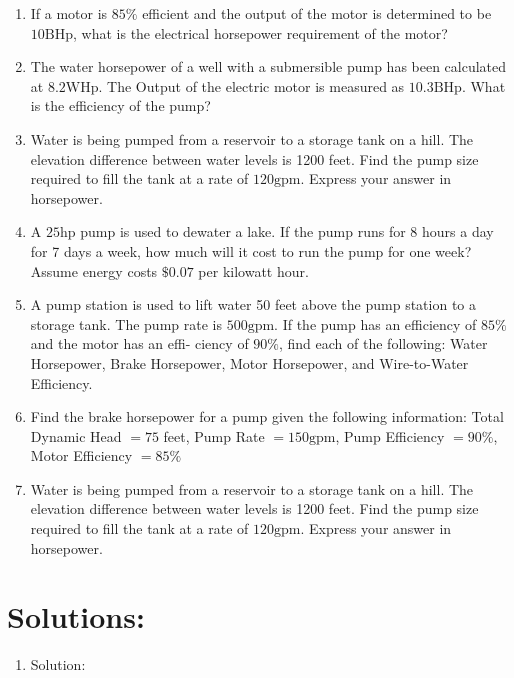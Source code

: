 \documentclass[10pt]{article}
\begin{document}
\begin{enumerate}
\begin{enumerate}
\begin{enumerate}
  \item If a motor is $85 \%$ efficient and the output of the motor is determined to be $10 \mathrm{BHp}$, what is the electrical horsepower requirement of the motor?

  \item The water horsepower of a well with a submersible pump has been calculated at $8.2 \mathrm{WHp}$. The Output of the electric motor is measured as $10.3 \mathrm{BHp}$. What is the efficiency of the pump?

  \item Water is being pumped from a reservoir to a storage tank on a hill. The elevation difference between water levels is 1200 feet. Find the pump size required to fill the tank at a rate of $120 \mathrm{gpm}$. Express your answer in horsepower.

  \item A $25 \mathrm{hp}$ pump is used to dewater a lake. If the pump runs for 8 hours a day for 7 days a week, how much will it cost to run the pump for one week? Assume energy costs $\$ 0.07$ per kilowatt hour.

  \item A pump station is used to lift water 50 feet above the pump station to a storage tank. The pump rate is $500 \mathrm{gpm}$. If the pump has an efficiency of $85 \%$ and the motor has an effi- ciency of $90 \%$, find each of the following: Water Horsepower, Brake Horsepower, Motor Horsepower, and Wire-to-Water Efficiency.

  \item Find the brake horsepower for a pump given the following information: Total Dynamic Head $=75$ feet, Pump Rate $=150 \mathrm{gpm}$, Pump Efficiency $=90 \%$, Motor Efficiency $=85 \%$

  \item Water is being pumped from a reservoir to a storage tank on a hill. The elevation difference between water levels is 1200 feet. Find the pump size required to fill the tank at a rate of $120 \mathrm{gpm}$. Express your answer in horsepower.

\end{enumerate}

\section{Solutions:}
\begin{enumerate}
  \item Solution:
\end{enumerate}


\end{enumerate}
\end{enumerate}
\end{document}
